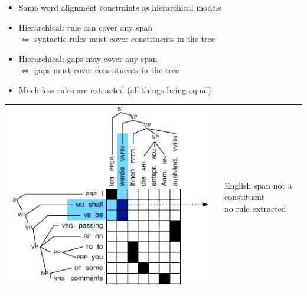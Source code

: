 \documentclass[landscape]{slides}
\begin{document}

\vspace{15mm}
\begin{itemize}
\item Same word alignment constraints as hierarchical models
\item Hierarchical: rule can cover any span\\
$\Leftrightarrow$ syntactic rules must cover constituents in the tree
\item Hierarchical: gaps may cover any span\\
$\Leftrightarrow$ gaps must cover constituents in the tree
\vspace{10mm}
\item Much less rules are extracted (all things being equal)
\end{itemize}


\begin{center}
\begin{tabular}{rl}
\includegraphics[scale=1.17]{hierarchical-phrase-extraction-syntax2.pdf}
& 
\parbox{95mm}{ \phantom{.}\vspace{-11cm}
English span not a constituent\\
no rule extracted
}
\end{tabular}
\end{center}
\end{document}
